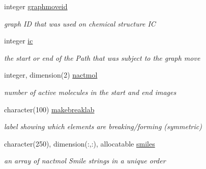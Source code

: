 \begin{DoxyCompactItemize}
integer \mbox{\hyperlink{structrpath_1_1fingerprint_a57a154087205a98dcddecdb5982bf0ad}{graphmoveid}}
\begin{DoxyCompactList}\small\item\em graph ID that was used on chemical structure IC \end{DoxyCompactList}\item 
\mbox{\label{structrpath_1_1fingerprint_a92b066de96ca0fd0f07ea48443dd7f29}} 
integer \mbox{\hyperlink{structrpath_1_1fingerprint_a92b066de96ca0fd0f07ea48443dd7f29}{ic}}
\begin{DoxyCompactList}\small\item\em the start or end of the Path that was subject to the graph move \end{DoxyCompactList}\item 
\mbox{\label{structrpath_1_1fingerprint_a9347f0684eabf847f9941699ebd9428a}} 
integer, dimension(2) \mbox{\hyperlink{structrpath_1_1fingerprint_a9347f0684eabf847f9941699ebd9428a}{nactmol}}
\begin{DoxyCompactList}\small\item\em number of active molecules in the start and end images \end{DoxyCompactList}\item 
\mbox{\label{structrpath_1_1fingerprint_a31f00c45aa6316473747a88be20b4f80}} 
character(100) \mbox{\hyperlink{structrpath_1_1fingerprint_a31f00c45aa6316473747a88be20b4f80}{makebreaklab}}
\begin{DoxyCompactList}\small\item\em label showing which elements are breaking/forming (symmetric) \end{DoxyCompactList}\item 
\mbox{\label{structrpath_1_1fingerprint_af163203d1c299891384f2c90224ceb25}} 
character(250), dimension(\+:,\+:), allocatable \mbox{\hyperlink{structrpath_1_1fingerprint_af163203d1c299891384f2c90224ceb25}{smiles}}
\begin{DoxyCompactList}\small\item\em an array of nactmol Smile strings in a unique order \end{DoxyCompactList}\item 
\mbox{\label{structrpath_1_1fingerprint_a30fcbb0998685ed985faab7fa832d0c5}} 

\end{DoxyCompactItemize}
